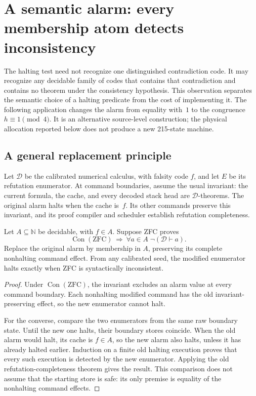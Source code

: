 \section{A semantic alarm: every membership atom detects inconsistency}
\label{sec:membership-alarm}

The halting test need not recognize one distinguished contradiction code.
It may recognize any decidable family of codes that contains that
contradiction and contains no theorem under the consistency hypothesis.
This observation separates the semantic choice of a halting predicate from
the cost of implementing it.  The following application changes the alarm
from equality with~$1$ to the congruence $h\equiv1\pmod4$.
It is an alternative source-level construction; the physical allocation
reported below does not produce a new 215-state machine.

\subsection{A general replacement principle}

Let $\mathcal D$ be the calibrated numerical calculus, with falsity code
$f$, and let $E$ be its refutation enumerator.  At command boundaries,
assume the usual invariant: the current formula, the cache, and every
decoded stack head are $\mathcal D$-theorems.  The original alarm halts
when the cache is~$f$.  Its other commands preserve this invariant, and
its proof compiler and scheduler establish refutation completeness.

\begin{proposition}
\label{prop:semantic-alarm}
Let $A\subseteq\mathbb N$ be decidable, with $f\in A$.  Suppose ZFC proves
\[
 \operatorname{Con}(\mathrm{ZFC})\ \Longrightarrow\
 \forall a\in A\;\neg(\mathcal D\vdash a).
\]
Replace the original alarm by membership in $A$, preserving its complete
nonhalting command effect.  From any calibrated seed, the modified
enumerator halts exactly when ZFC is syntactically inconsistent.
\end{proposition}

\begin{proof}
Under $\operatorname{Con}(\mathrm{ZFC})$, the invariant excludes an alarm
value at every command boundary.  Each nonhalting modified command has
the old invariant-preserving effect, so the new enumerator cannot halt.

For the converse, compare the two enumerators from the same raw boundary
state.  Until the new one halts, their boundary stores coincide.  When
the old alarm would halt, its cache is $f\in A$, so the new alarm also
halts, unless it has already halted earlier.  Induction on a finite old
halting execution proves that every such execution is detected by the
new enumerator.  Applying the old refutation-completeness theorem gives
the result.  This comparison does not assume that the starting store is
safe: its only premise is equality of the nonhalting command effects.
\end{proof}

